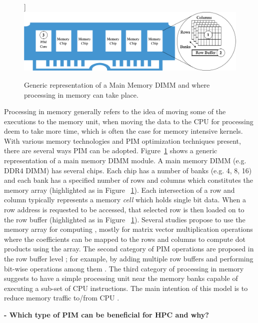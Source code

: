 \begin{figure}[[hbt!]]
\centering
\includegraphics[width=.8\linewidth]{MEMSYS22/figures/pimcat.png}
\caption{Generic representation of a Main Memory DIMM and where processing in memory can take place.}
\label{fig:pimcat}
\end{figure}   




Processing in memory generally refers to the idea of moving some of the executions to the memory unit, when moving the data to the CPU for processing deem to take more time, which is often the case for memory intensive kernels. With various memory technologies and PIM optimization techniques present, there are several ways PIM can be adopted. Figure~\ref{fig:pimcat} shows a generic representation of a main memory DIMM module. A main memory DIMM (e.g. DDR4 DIMM) has several chips. Each chip has a number of banks (e.g. 4, 8, 16) and each bank has a specified number of rows and columns which constitutes the memory array (highlighted as  in Figure ~\ref{fig:pimcat}). Each intersection of a row and column typically represents a memory \textit{cell} which holds single bit data. When a row address is requested to be accessed, that selected row is then loaded on to the row buffer (highlighted as  in Figure ~\ref{fig:pimcat}). Several studies propose to use the memory array  for computing \cite{03,06,13,15,20,29}, mostly for matrix vector multiplication operations where the coefficients can be mapped to the rows and columns to compute dot products using the array. The second category of PIM operations are proposed in the row buffer level ; for example, by adding multiple row buffers and performing bit-wise operations among them \cite{31}. The third category of processing in memory suggests to have a simple processing unit near the memory banks capable of executing a sub-set of CPU instructions. The main intention of this model is to reduce memory traffic to/from CPU \cite{01,02,05,11,12,17,30,32,33,34,35}. 









\textbf{-	Which type of PIM can be beneficial for HPC and why?} \\




  